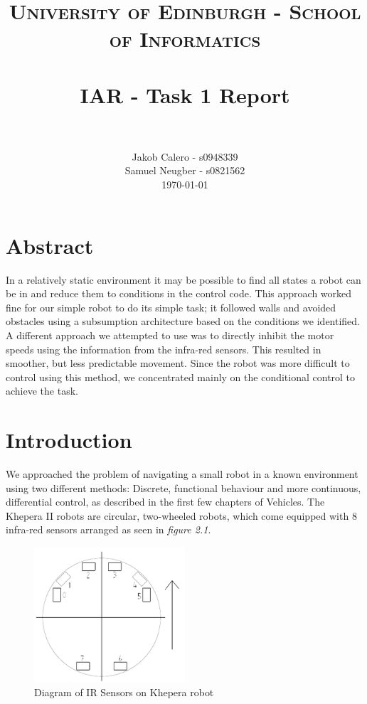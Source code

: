 \documentclass[paper=a4, fontsize=12pt]{scrartcl}	%
\title{
\vspace{-1in} 	
\usefont{OT1}{bch}{b}{n}
\normalfont \normalsize \textsc{University of Edinburgh - School of Informatics} \\ [25pt]
\horrule{0.5pt} \\[0.4cm]
\large IAR - Task 1 Report \\
\horrule{1pt} \\[0.5cm]
}
\author{
  \normalfont \normalsize
  Jakob Calero - s0948339\\[-3pt]\normalsize
  Samuel Neugber - s0821562\\[-3pt]\normalsize
  \today
}
\date{}
\numberwithin{equation}{section}		%
\numberwithin{figure}{section}			%
\numberwithin{table}{section}				%
\begin{document}
\maketitle					%
\section{Abstract}
In a relatively static environment it may be possible to find all states a robot can be in and reduce them to conditions in the control code. This approach worked fine for our simple robot to do its simple task; it followed walls and avoided obstacles using a subsumption architecture based on the conditions we identified. A different approach we attempted to use was to directly inhibit the motor speeds using the information from the infra-red sensors. This resulted in smoother, but less predictable movement. Since the robot was more difficult to control using this method, we concentrated mainly on the conditional control to achieve the task.

\section{Introduction}
We approached the problem of navigating a small robot in a known environment using two different methods: Discrete, functional behaviour and more continuous, differential control, as described in the first few chapters of Vehicles\cite[p.6-9]{vehicles}. The Khepera II robots are circular, two-wheeled robots, which come equipped with 8 infra-red sensors arranged as seen in \emph{figure 2.1}. 
\begin{figure}[!ht]
 \centering
  \includegraphics[width=0.5\textwidth]{IRSensors}
  \caption{Diagram of IR Sensors on Khepera robot}
\end{figure}
\end{document}
